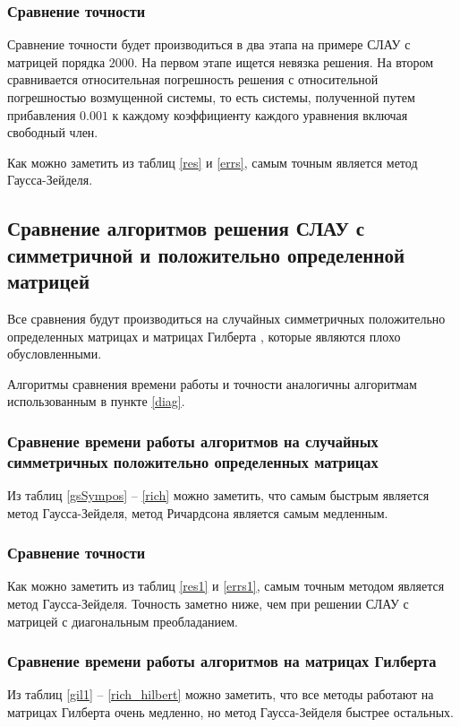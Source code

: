 \documentclass[14pt]{extarticle}
\begin{document}
\subsubsection{Сравнение точности}
Сравнение точности будет производиться в два этапа на примере СЛАУ с матрицей 
порядка $2000$. На первом этапе ищется невязка решения.
На втором сравнивается относительная погрешность решения
с относительной погрешностью возмущенной системы,
то есть системы, полученной путем прибавления  $0.001$ к каждому коэффициенту 
каждого уравнения включая свободный член.

Как можно заметить из таблиц 
\ref{res} и \ref{errs}, самым точным является метод Гаусса-Зейделя.


\subsection{Сравнение алгоритмов решения СЛАУ с симметричной и положительно определенной матрицей}
Все сравнения будут производиться
на случайных симметричных
положительно определенных матрицах и матрицах Гилберта \cite{book} , которые являются плохо обусловленными.

Алгоритмы сравнения времени работы и точности  аналогичны алгоритмам использованным в пункте \ref{diag}.
\subsubsection{Сравнение времени работы алгоритмов на случайных симметричных положительно определенных матрицах}
Из таблиц \ref{gsSympos} -- \ref{rich} можно заметить,
что самым быстрым является метод Гаусса-Зейделя, метод Ричардсона является самым медленным.




\pagebreak
\subsubsection{Сравнение точности}
Как можно заметить из таблиц \ref{res1} и \ref{errs1}, самым точным методом является метод Гаусса-Зейделя.
Точность заметно ниже, чем при решении СЛАУ с матрицей с диагональным преобладанием.



\subsubsection{Сравнение времени работы алгоритмов на матрицах Гилберта}
Из таблиц \ref{gil1} -- \ref{rich_hilbert} можно заметить, что все методы работают на матрицах Гилберта очень медленно, но метод Гаусса-Зейделя быстрее остальных.




\end{document}
